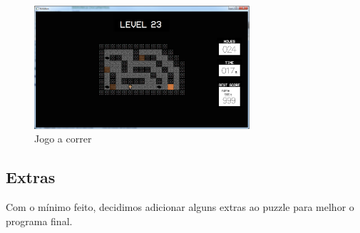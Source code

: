 \documentclass[a4paper]{article}
\begin{document}
\begin{figure}[H]
\centering
\includegraphics[width=8cm]{jogo.png}
\caption{Jogo a correr}
\end{figure}

\subsection{Extras}

Com o mínimo feito, decidimos adicionar alguns extras ao puzzle para melhor o programa final.
\end{document}

